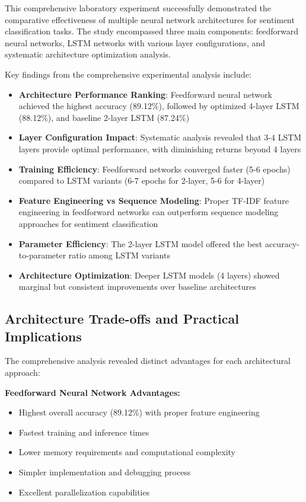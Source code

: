 \documentclass[a4paper, journal]{IEEEtran}
\begin{document}
This comprehensive laboratory experiment successfully demonstrated the comparative effectiveness of multiple neural network architectures for sentiment classification tasks. The study encompassed three main components: feedforward neural networks, LSTM networks with various layer configurations, and systematic architecture optimization analysis.

Key findings from the comprehensive experimental analysis include:

\begin{itemize}
    \item \textbf{Architecture Performance Ranking}: Feedforward neural network achieved the highest accuracy (89.12\%), followed by optimized 4-layer LSTM (88.12\%), and baseline 2-layer LSTM (87.24\%)
    \item \textbf{Layer Configuration Impact}: Systematic analysis revealed that 3-4 LSTM layers provide optimal performance, with diminishing returns beyond 4 layers
    \item \textbf{Training Efficiency}: Feedforward networks converged faster (5-6 epochs) compared to LSTM variants (6-7 epochs for 2-layer, 5-6 for 4-layer)
    \item \textbf{Feature Engineering vs Sequence Modeling}: Proper TF-IDF feature engineering in feedforward networks can outperform sequence modeling approaches for sentiment classification
    \item \textbf{Parameter Efficiency}: The 2-layer LSTM model offered the best accuracy-to-parameter ratio among LSTM variants
    \item \textbf{Architecture Optimization}: Deeper LSTM models (4 layers) showed marginal but consistent improvements over baseline architectures
\end{itemize}

\subsection{Architecture Trade-offs and Practical Implications}

The comprehensive analysis revealed distinct advantages for each architectural approach:

\textbf{Feedforward Neural Network Advantages:}
\begin{itemize}
    \item Highest overall accuracy (89.12\%) with proper feature engineering
    \item Fastest training and inference times
    \item Lower memory requirements and computational complexity
    \item Simpler implementation and debugging process
    \item Excellent parallelization capabilities
\end{itemize}
\end{document}
